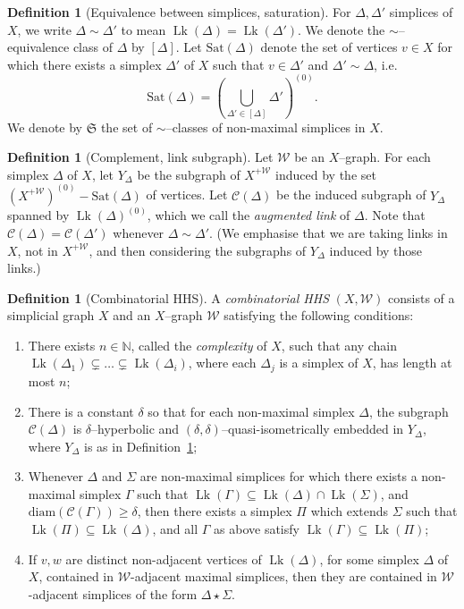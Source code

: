 \documentclass[svgnames]{amsart}
\theoremstyle{plain}
\theoremstyle{definition}
\newtheorem{defn}[thm]{Definition}
\newcommand{\frakS}{\mathfrak S}
\newcommand{\diam}{\mathrm{diam}}
\newcommand{\C}{\mathcal C}
\newcommand{\link}{\operatorname{Lk}}
\newcommand{\duaug}[2]{{#1}^{+{#2}}}
\newcommand{\Sat}{\mathrm{Sat}}
\newcommand{\W}{\mathcal{W}}
\begin{document}
\begin{defn}[Equivalence between simplices, saturation]\label{defn:simplex_equivalence}
For $\Delta,\Delta'$ simplices of $X$, we write $\Delta\sim\Delta'$ to mean $\link(\Delta)=\link(\Delta')$. We denote the $\sim$--equivalence class of $\Delta$ by $[\Delta]$.
Let $\Sat(\Delta)$ denote the set of vertices $v\in X$ for which there exists a simplex $\Delta'$ of $X$ such that $v\in\Delta'$ and $\Delta'\sim\Delta$, i.e.
$$\Sat(\Delta)=\left(\bigcup_{\Delta'\in[\Delta]}\Delta'\right)^{(0)}.$$
We denote by $\frakS$ the set of $\sim$--classes of non-maximal simplices in $X$.
\end{defn}


\begin{defn}[Complement, link subgraph]\label{defn:complement}
Let $\W$ be an $X$--graph.  For each simplex $\Delta$ of $X$, let $Y_\Delta$ be the subgraph of $\duaug{X}{\W}$ induced by the set $(\duaug{X}{\W})^{(0)}-\Sat(\Delta)$ of vertices. Let $\C  (\Delta)$ be the induced subgraph of $Y_\Delta$ spanned by $\link(\Delta)^{(0)}$, which we call the \emph{augmented link} of $\Delta$.  Note that $\C  (\Delta)=\C  (\Delta')$ whenever $\Delta\sim\Delta'$. (We emphasise that we are taking links in $X$, not in $\duaug{X}{\W}$, and then considering the subgraphs of $Y_\Delta$ induced by those links.)
\end{defn}


\begin{defn}[Combinatorial HHS]\label{defn:combinatorial_HHS}
A \emph{combinatorial HHS} $(X,\W)$ consists of a simplicial graph $X$ and an $X$--graph $\W$ satisfying the following conditions:
\begin{enumerate}
    \item \label{item:chhs_flag} There exists $n\in\mathbb N$, called the \emph{complexity} of $X$, such that any chain $\link(\Delta_1)\subsetneq\dots\subsetneq\link(\Delta_i)$, where each $\Delta_j$ is a simplex of $X$, has length at most $n$;
    \item \label{item:chhs_delta} There is a constant $\delta$ so that for each non-maximal simplex $\Delta$, the subgraph $\C  (\Delta)$ is $\delta$--hyperbolic and $(\delta,\delta)$--quasi-isometrically embedded in $Y_\Delta$, where $Y_\Delta$ is as in Definition~\ref{defn:complement};
    \item \label{item:chhs_join} Whenever $\Delta$ and $\Sigma$ are non-maximal simplices for which there exists a non-maximal simplex $\Gamma$ such that $\link(\Gamma)\subseteq\link(\Delta)\cap \link(\Sigma)$, and $\diam(\C   (\Gamma))\geq \delta$, then there exists a simplex $\Pi$ which extends $\Sigma$ such that $\link(\Pi)\subseteq \link(\Delta)$, and all $\Gamma$ as above satisfy $\link(\Gamma)\subseteq\link(\Pi)$;
    \item \label{item:C_0=C} If $v,w$ are distinct non-adjacent vertices of $\link(\Delta)$, for some simplex $\Delta$ of $X$, contained in $\W$-adjacent maximal simplices, then they are contained in $\W$-adjacent simplices of the form $\Delta\star\Sigma$.
\end{enumerate}
\end{defn}
\end{document}
